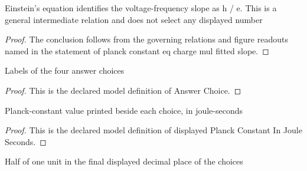 \begin{lemma}
  \label{lem:physics:phyx-mini-0516:phyxminiproblems-problemphyxmini0516-planck-constant-eq-charge-mul-fitted-slope}
  Einstein's equation identifies the voltage-frequency slope as h / e. This is a general intermediate relation and does not select any displayed number
\end{lemma}
\begin{proof}
  The conclusion follows from the governing relations and figure readouts named in the statement of planck constant eq charge mul fitted slope.
\end{proof}
\begin{definition}
  \label{def:physics:phyx-mini-0516:phyxminiproblems-problemphyxmini0516-answerchoice}
  Labels of the four answer choices
\end{definition}
\begin{proof}
  This is the declared model definition of Answer Choice.
\end{proof}
\begin{definition}
  \label{def:physics:phyx-mini-0516:phyxminiproblems-problemphyxmini0516-displayedplanckconstantinjouleseconds}
  Planck-constant value printed beside each choice, in joule-seconds
\end{definition}
\begin{proof}
  This is the declared model definition of displayed Planck Constant In Joule Seconds.
\end{proof}
\begin{definition}
  \label{def:physics:phyx-mini-0516:phyxminiproblems-problemphyxmini0516-answerhalfunitinjouleseconds}
  Half of one unit in the final displayed decimal place of the choices
\end{definition}
